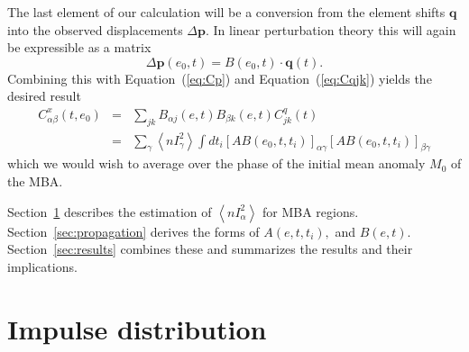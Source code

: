 \documentclass[linenumbers, onecolumn]{aastex631}
\newcommand{\eqq}[1]{Equation~(\ref{#1})}
\newcommand{\vecp}{\mathbf{p}}
\newcommand{\vecq}{\mathbf{q}}
\newcommand{\matA}{A}
\newcommand{\matB}{B}
\newcommand{\covm}{C}
\begin{document}
The last element of our calculation will be a conversion from the element shifts $\vecq$ into the observed displacements $\Delta\vecp$.  In linear perturbation theory this will again be expressible as a matrix
\begin{equation}
  \Delta\vecp(e_0,t) = \matB(e_0,t) \cdot \vecq(t).
\label{eq:B}
\end{equation}
Combining this with \eqq{eq:Cp} and \eqq{eq:Cqjk} yields the desired result
\begin{eqnarray}
  \covm^x_{\alpha\beta}(t,e_0) & = & \sum_{jk} B_{\alpha j}(e,t) B_{\beta k}(e,t) \covm^q_{jk}(t) \nonumber \\
  & = & \sum_\gamma \left\langle nI_\gamma^2\right\rangle \int dt_i \left[AB(e_0,t,t_i)\right]_{\alpha\gamma}  \left[AB(e_0,t,t_i)\right]_{\beta\gamma} 
\label{eq:ABq}
\end{eqnarray}
which we would wish to average over the phase of the initial mean anomaly $M_0$ of the MBA.

Section~\ref{sec:impulse} describes the estimation of $\left\langle
  nI_\alpha^2\right\rangle$ for MBA regions.
Section~\ref{sec:propagation} derives the forms of $\matA(e,t,t_i),$
and $\matB(e,t).$  Section~\ref{sec:results} combines these and
summarizes the results and their implications.

\section{Impulse distribution}
\label{sec:impulse}
\end{document}
